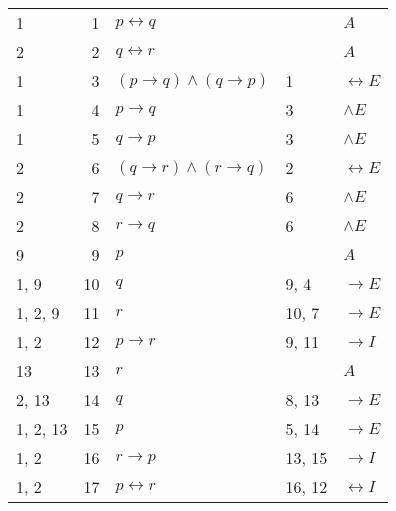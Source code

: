 \documentclass{article}
\begin{document}
\begin{table}[htbp]
\begin{tabular}{lrlll}
{1} & 1 & $p↔q$ & {} & $A$ \\
{2} & 2 & $q↔r$ & {} & $A$ \\
{1} & 3 & $(p→q)∧(q→p)$ & {1} & $↔E$ \\
{1} & 4 & $p→q$ & {3} & $∧E$ \\
{1} & 5 & $q→p$ & {3} & $∧E$ \\
{2} & 6 & $(q→r)∧(r→q)$ & {2} & $↔E$ \\
{2} & 7 & $q→r$ & {6} & $∧E$ \\
{2} & 8 & $r→q$ & {6} & $∧E$ \\
{9} & 9 & $p$ & {} & $A$ \\
{1, 9} & 10 & $q$ & {9, 4} & $→E$ \\
{1, 2, 9} & 11 & $r$ & {10, 7} & $→E$ \\
{1, 2} & 12 & $p→r$ & {9, 11} & $→I$ \\
{13} & 13 & $r$ & {} & $A$ \\
{2, 13} & 14 & $q$ & {8, 13} & $→E$ \\
{1, 2, 13} & 15 & $p$ & {5, 14} & $→E$ \\
{1, 2} & 16 & $r→p$ & {13, 15} & $→I$ \\
{1, 2} & 17 & $p↔r$ & {16, 12} & $↔I$ \\
\end{tabular}
\end{table}
\end{document}
